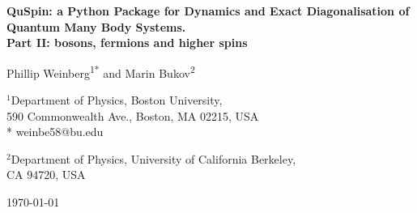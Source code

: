 \documentclass{SciPost}
\newcommand\0{\scalebox{-1}[1]{0}}
\begin{document}
\begin{center}{\Large \textbf{
QuSpin: a Python Package for Dynamics and Exact Diagonalisation of Quantum Many Body Systems.\\
\large Part II: bosons, fermions and higher spins
}}\end{center}

\begin{center}
Phillip Weinberg\textsuperscript{1*} and Marin Bukov\textsuperscript{2}
\end{center}

\begin{center}
$^1$Department of Physics, Boston University, \\
590 Commonwealth Ave., Boston, MA 02215, USA
\\
* weinbe58@bu.edu
\end{center}

\begin{center}
$^2$Department of Physics, University of California Berkeley, \\
CA 94720, USA
\\
\end{center}

\begin{center}
\today
\end{center}

\end{document}
